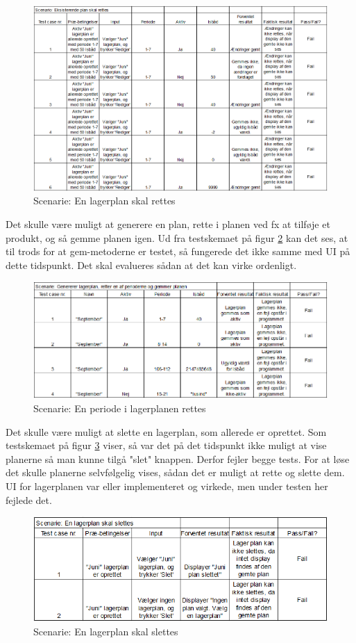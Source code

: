 \begin{figure}[p]
    \centering
    \includegraphics[width=0.7\hsize]{figures/tests/edit_existing_plan.png}
    \caption{Scenarie: En lagerplan skal rettes}
    \label{fig:testedit}
\end{figure}

Det skulle være muligt at generere en plan, rette i planen ved fx at tilføje et produkt, og så gemme planen igen. Ud fra testskemaet på figur \ref{fig:testeditperiod} kan det ses, at til trods for at gem-metoderne er testet, så fungerede det ikke samme med UI på dette tidspunkt. Det skal evalueres sådan at det kan virke ordenligt.

\begin{figure}[p]
    \centering
    \includegraphics[width=0.7\hsize]{figures/tests/test_ret_plan.png}
    \caption{Scenarie: En periode i lagerplanen rettes}
    \label{fig:testeditperiod}
\end{figure}

Det skulle være muligt at slette en lagerplan, som allerede er oprettet. Som testskemaet på figur \ref{fig:testdelete} viser, så var det på det tidspunkt ikke muligt at vise planerne så man kunne tilgå "slet" knappen. Derfor fejler begge tests. For at løse det skulle planerne selvfølgelig vises, sådan det er muligt at rette og slette dem. UI for lagerplanen var eller implementeret og virkede, men under testen her fejlede det.

\begin{figure}[p]
    \centering
    \includegraphics[width=0.7\hsize]{figures/tests/test_slet_lagerplan.png}
    \caption{Scenarie: En lagerplan skal slettes}
    \label{fig:testdelete}
\end{figure}





